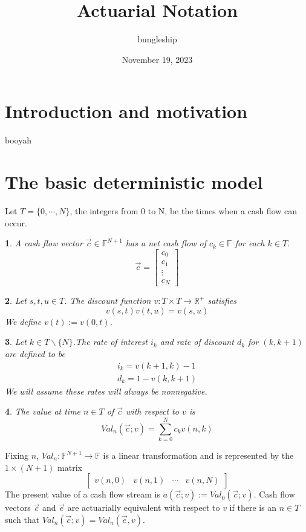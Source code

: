 \documentclass{article}
\newtheorem*{defn}{}
\begin{document}
\title{Actuarial Notation}
\author{bungleship}
\date{November 19, 2023}
\maketitle
\section{Introduction and motivation}
booyah
\section{The basic deterministic model}
Let $T = \{0,\cdots,N\}$, the integers from 0 to N, be the times when a cash flow can occur.
\begin{defn}
  A cash flow vector $\vec{c} \in \mathbb{F}^{N+1}$ has a net cash flow of $c_k \in \mathbb{F}$ for each $k \in T$.
$$
\vec{c} = \begin{bmatrix}
    c_0 \\
    c_1 \\
    \vdots \\
    c_N
  \end{bmatrix}
$$
\end{defn}
\begin{defn}
  Let $s,t,u \in T$. The discount function $v\colon T \times T \to \mathbb{R}^+$ satisfies
$$
v(s,t)v(t,u) = v(s,u)
$$
We define $v(t) :=v(0,t)$.
\end{defn}
\begin{defn}
  Let $k \in T \backslash \{N\}$.The rate of interest $i_k$ and rate of discount $d_k$ for $(k,k+1)$ are defined to be
$$
\begin{matrix}
i_k = v(k+1, k) - 1\\
d_k = 1 - v(k,k+1)
\end{matrix}
$$
We will assume these rates will always be nonnegative.
\end{defn}
\begin{defn}
  The value at time $n \in T$ of $\vec{c}$ with respect to $v$ is 
$$
Val_n (\vec{c};v) = \sum_{k=0}^{N} {c_k v(n,k)}
$$
\end{defn}
Fixing $n$, $Val_n\colon \mathbb{F}^{N+1} \to \mathbb{F}$ is a linear transformation and is represented by the $1 \times (N+1)$ matrix
$$
\begin{bmatrix}
v(n,0) & v(n,1) & \cdots & v(n,N)
\end{bmatrix}
$$
The present value of a cash flow stream is $\ddot{a}(\vec{c};v) := Val_0 (\vec{c};v)$. Cash flow vectors $\vec{c}$ and $\vec{e}$ are actuarially equivalent with respect to $v$ if there is an $n \in T$ such that $Val_n(\vec{c};v) = Val_n(\vec{e},v)$.
\end{document}
